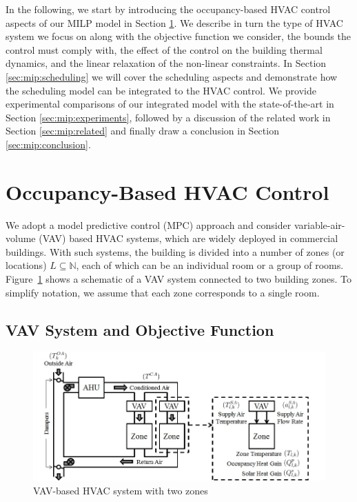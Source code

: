 In the following, we start by introducing the occupancy-based HVAC control aspects of our MILP model in Section \ref{sec:mip:control}. We describe in turn the type of HVAC system we focus on along with the objective function we consider, the bounds the control must comply with, the effect of the control on the building thermal dynamics, and the linear relaxation of the non-linear constraints. In Section \ref{sec:mip:scheduling} we will cover the scheduling aspects and demonstrate how the scheduling model can be integrated to the HVAC control. We provide experimental comparisons of our integrated model with the state-of-the-art in Section \ref{sec:mip:experiments}, followed by a discussion of the related work in Section \ref{sec:mip:related} and finally draw a conclusion in Section \ref{sec:mip:conclusion}. 


\section{Occupancy-Based HVAC Control}
\label{sec:mip:control}

We adopt a model predictive control (MPC) approach and consider variable-air-volume (VAV) based HVAC systems, which are widely
deployed in commercial buildings. With such systems, the building is divided into a number of zones (or locations) $L\subseteq\mathbb{N}$,
each of which can be an individual room or a group of rooms. Figure~\ref{fig:hvac} shows a schematic of a VAV system connected to two building zones.  To simplify notation, we assume that each zone corresponds to a
single room. %

\subsection{VAV System and Objective Function}
\begin{figure}
	\centering
		\includegraphics[width=0.74\linewidth,keepaspectratio]{./figs/vav_new.jpg}		
	\caption{VAV-based HVAC system with two zones}
	\label{fig:hvac}
\end{figure}

